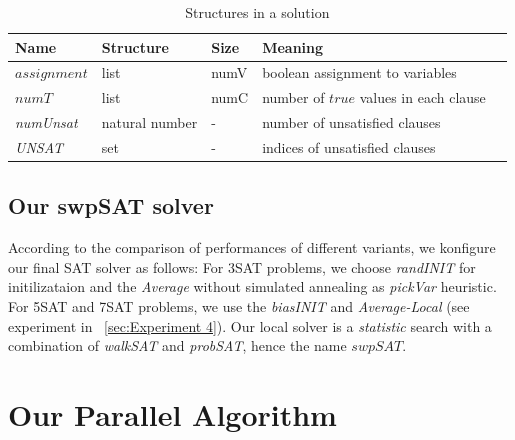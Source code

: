 \documentclass[12pt,a4paper,twoside]{scrartcl}
\numberwithin{equation}{section}
\begin{document}
\begin{table}[h!]
\begin{center}
    \begin{tabular}{|l|l|l|l|p{1cm}|}
\hline 
 	Name &Structure & Size & Meaning\\ \hline
    $assignment$&list & numV & boolean assignment to variables\\ \hline
	$numT$&list & numC& number of $true$ values in each clause \\ \hline
	\emph{numUnsat}& natural number & -& number of unsatisfied clauses  \\ \hline
	\emph{UNSAT}& set & - & indices of unsatisfied clauses \\ \hline

	
\end{tabular}
\caption[probSAT]{Structures in a solution}
\end{center}
\end{table} 
\subsection{Our swpSAT solver}
\label{subsec:swpSAT}
According to the comparison of performances of different variants,  we konfigure our final SAT solver as follows: For 3SAT problems, we choose \emph{randINIT} for initilizataion and the \emph{Average}  without simulated annealing as \emph{pickVar} heuristic. For 5SAT and 7SAT problems, we use the \emph{biasINIT} and \emph{Average-Local} (see experiment in ~\ref{sec:Experiment 4}).  Our local solver is a \emph{statistic} search with a combination of \emph{walkSAT} and \emph{probSAT}, hence the name $swpSAT$.
\section{Our Parallel Algorithm}
\label{sec:parallel}
\label{sec:Our parallel Algorithm}
\end{document}
